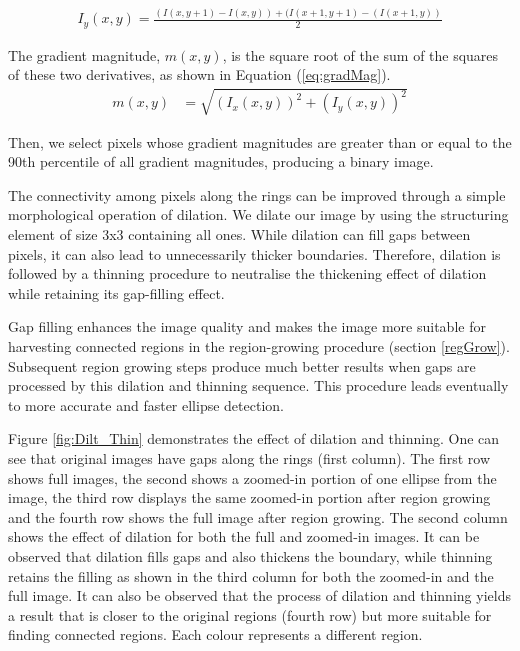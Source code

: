 \documentclass[preprint]{iucr}              %
\begin{document}
\begin{align} \label{eq:gradY}
I_{y}(x,y) = \frac{(I(x,y+1)-I(x,y)) + (I(x+1,y+1)-(I(x+1,y))}{2}
\end{align}

The gradient magnitude, $m(x,y)$, is the square root of the sum of the squares
of these two derivatives, as shown in Equation (\ref{eq:gradMag}). 
\begin{align} \label{eq:gradMag}
m(x,y)&=\sqrt{(I_{x}(x,y))^2+(I_{y}(x,y))^2}
\end{align}

Then, we select pixels whose gradient magnitudes are greater than or equal to
the 90th percentile of all gradient magnitudes, producing a binary image. 

The connectivity among pixels along the rings can be improved through a simple
morphological operation of dilation. 
 We dilate our image by using the structuring element of size 3x3 containing all
 ones. 
While dilation can fill gaps between pixels, it can also lead to unnecessarily
thicker boundaries. 
Therefore, dilation is followed by a thinning procedure to neutralise the
thickening effect of dilation while retaining its gap-filling effect. 

Gap filling enhances the image quality and makes the image more suitable for
harvesting connected regions in the region-growing procedure (section
\ref{regGrow}).  
Subsequent region growing steps produce much better results when gaps are
processed by this dilation and thinning sequence. 
This procedure leads eventually to more accurate and faster ellipse detection. 

Figure \ref{fig:Dilt_Thin} demonstrates the effect of dilation and thinning.
One can see that original images have gaps along the rings (first column).
The first row shows full images, the second shows a zoomed-in portion of one
ellipse from the image, the third row displays the same zoomed-in portion after
region growing and the fourth row shows the full image after region growing.  
The second column shows the effect of dilation for both the full and zoomed-in
images. 
It can be observed that dilation fills gaps and also thickens the boundary,
while thinning retains the filling as shown in the third column for both the
zoomed-in and the full image.  
It can also be observed that the process of dilation and thinning yields a
result that is closer to the original regions (fourth row) but more suitable for
finding connected regions.  
Each colour represents a different region.
\end{document}
